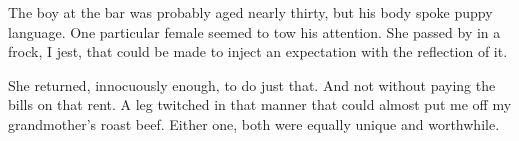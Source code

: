 

﻿The boy at the bar was probably aged nearly thirty, but his body spoke
puppy language.  One particular female seemed to tow his attention.
She passed by in a frock, I jest, that could be made to inject an
expectation with the reflection of it.

She returned, innocuously enough, to do just that.  And not without
paying the bills on that rent.  A leg twitched in that manner that
could almost put me off my grandmother's roast beef.  Either one, both
were equally unique and worthwhile.

\bye
